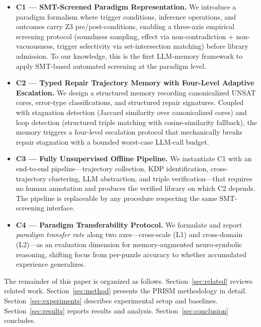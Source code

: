 \begin{itemize}
    \item \textbf{C1 — SMT-Screened Paradigm Representation.} We introduce a paradigm formalism where trigger conditions, inference operations, and outcomes carry Z3 pre/post-conditions, enabling a three-axis empirical screening protocol (soundness sampling, effect via non-contradiction + non-vacuousness, trigger selectivity via set-intersection matching) before library admission. To our knowledge, this is the first LLM-memory framework to apply SMT-based automated screening at the paradigm level.

    \item \textbf{C2 — Typed Repair Trajectory Memory with Four-Level Adaptive Escalation.} We design a structured memory recording canonicalized UNSAT cores, error-type classifications, and structured repair signatures. Coupled with stagnation detection (Jaccard similarity over canonicalized cores) and loop detection (structured triple matching with cosine-similarity fallback), the memory triggers a four-level escalation protocol that mechanically breaks repair stagnation with a bounded worst-case LLM-call budget.

    \item \textbf{C3 — Fully Unsupervised Offline Pipeline.} We instantiate C1 with an end-to-end pipeline—trajectory collection, KDP identification, cross-trajectory clustering, LLM abstraction, and triple verification—that requires no human annotation and produces the verified library on which C2 depends. The pipeline is replaceable by any procedure respecting the same SMT-screening interface.

    \item \textbf{C4 — Paradigm Transferability Protocol.} We formulate and report \textit{paradigm transfer rate} along two axes—cross-scale (L1) and cross-domain (L2)—as an evaluation dimension for memory-augmented neuro-symbolic reasoning, shifting focus from per-puzzle accuracy to whether accumulated experience generalizes.
\end{itemize}

The remainder of this paper is organized as follows. Section~\ref{sec:related} reviews related work. Section~\ref{sec:method} presents the PRISM methodology in detail. Section~\ref{sec:experiments} describes experimental setup and baselines. Section~\ref{sec:results} reports results and analysis. Section~\ref{sec:conclusion} concludes.
